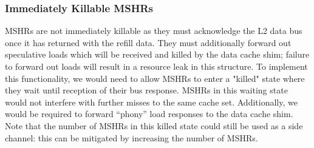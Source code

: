 \subsubsection{Immediately Killable MSHRs}
MSHRs are not immediately killable as they must acknowledge the L2 data bus once it has returned with the refill data. They must additionally forward out speculative loads which will be received and killed by the data cache shim; failure to forward out loads will result in a resource leak in this structure. To implement this functionality, we would need to allow MSHRs to enter a "killed" state where they wait until reception of their bus response. MSHRs in this waiting state would not interfere with further misses to the same cache set. Additionally, we would be required to forward ``phony'' load responses to the data cache shim. Note that the number of MSHRs in this killed state could still be used as a side channel: this can be mitigated by increasing the number of MSHRs.
